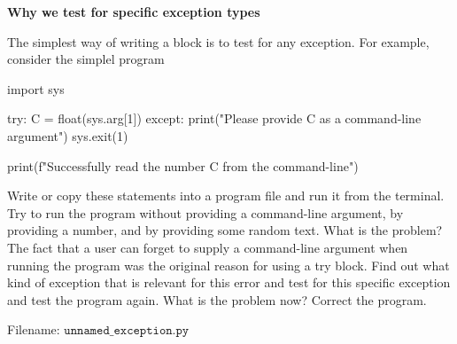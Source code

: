 \begin{Problem}{\textbf{Why we test for specific exception types}}

\noindent The simplest way of writing a  block is to test for any
exception. For example, consider the simplel program
\begin{python}
import sys

try:
    C = float(sys.arg[1])
except:
    print("Please provide C as a command-line argument")
    sys.exit(1)

print(f"Successfully read the number {C} from the command-line")
\end{python}

Write or copy these statements into a program file and run it from the
terminal. Try to run the program without providing a command-line
argument, by providing a number, and by providing some random text.
What is the problem? The fact that a user can forget to supply a command-line
argument when running the program was the original reason for using a try block.
Find out what kind of exception that is relevant for this error and test for
this specific exception and test the program again. What is the problem now?
Correct the program.

Filename: $\texttt{unnamed\_exception.py}$
\end{Problem}

